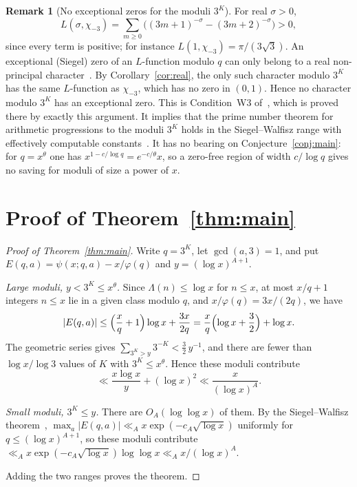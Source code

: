 \documentclass[12pt]{amsart}
\theoremstyle{plain}
\theoremstyle{definition}
\newtheorem{remark}[theorem]{Remark}
\begin{document}
\begin{remark}[No exceptional zeros for the moduli $3^K$]
\label{rem:W3}
For real $\sigma > 0$,
\[
  L(\sigma,\chi_{-3}) = \sum_{m \geq 0}\bigl((3m+1)^{-\sigma} - (3m+2)^{-\sigma}\bigr) > 0,
\]
since every term is positive; for instance $L(1,\chi_{-3}) = \pi/(3\sqrt3)$.
An exceptional (Siegel) zero of an $L$-function modulo $q$ can only belong
to a real non-principal character~\cite[Ch.~14]{Davenport2000}. By
Corollary~\ref{cor:real}, the only such character modulo $3^K$ has the same
$L$-function as $\chi_{-3}$, which has no zero in $(0,1)$. Hence no
character modulo $3^K$ has an exceptional zero. This is Condition~W3
of~\cite{WakilW3}, which is proved there by exactly this argument. It implies
that the prime number theorem for arithmetic progressions to the moduli $3^K$
holds in the Siegel--Walfisz range with effectively computable
constants~\cite[Ch.~20]{Davenport2000}. It has no bearing on
Conjecture~\ref{conj:main}: for $q = x^\theta$ one has
$x^{1 - c/\log q} = e^{-c/\theta}x$, so a zero-free region of width
$c/\log q$ gives no saving for moduli of size a power of $x$.
\end{remark}

\section{Proof of Theorem~\ref{thm:main}}
\label{sec:mainproof}

\begin{proof}[Proof of Theorem~\ref{thm:main}]
Write $q = 3^K$, let $\gcd(a,3) = 1$, and put
$E(q,a) = \psi(x;q,a) - x/\varphi(q)$ and $y = (\log x)^{A+1}$.

\emph{Large moduli, $y < 3^K \leq x^\theta$.} Since $\Lambda(n) \leq \log x$
for $n \leq x$, at most $x/q + 1$ integers $n \leq x$ lie in a given class
modulo $q$, and $x/\varphi(q) = 3x/(2q)$, we have
\[
  |E(q,a)| \leq \Bigl(\frac{x}{q} + 1\Bigr)\log x + \frac{3x}{2q}
  = \frac{x}{q}\Bigl(\log x + \frac32\Bigr) + \log x .
\]
The geometric series gives $\sum_{3^K > y} 3^{-K} < \tfrac32\, y^{-1}$, and
there are fewer than $\log x/\log 3$ values of $K$ with $3^K \leq x^\theta$.
Hence these moduli contribute
\[
  \ll \frac{x\log x}{y} + (\log x)^2 \ll \frac{x}{(\log x)^A}.
\]

\emph{Small moduli, $3^K \leq y$.} There are $O_A(\log\log x)$ of them. By the
Siegel--Walfisz theorem~\cite[Ch.~22]{Davenport2000},
$\max_a |E(q,a)| \ll_A x\exp(-c_A\sqrt{\log x})$ uniformly for
$q \leq (\log x)^{A+1}$, so these moduli contribute
$\ll_A x\exp(-c_A\sqrt{\log x})\log\log x \ll_A x/(\log x)^A$.

Adding the two ranges proves the theorem.
\end{proof}
\end{document}
